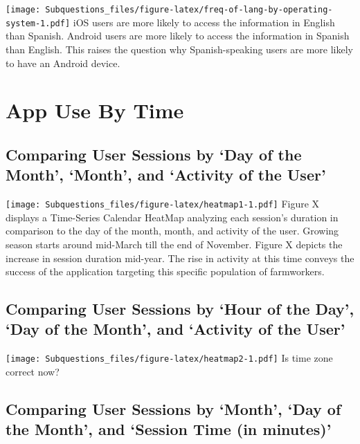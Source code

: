 \documentclass[
]{article}
\begin{document}
\texttt{[image: Subquestions\_files/figure-latex/freq-of-lang-by-operating-system-1.pdf]}
iOS users are more likely to access the information in English than
Spanish. Android users are more likely to access the information in
Spanish than English. This raises the question why Spanish-speaking
users are more likely to have an Android device.

\hypertarget{app-use-by-time}{%
\section{App Use By Time}\label{app-use-by-time}}

\hypertarget{comparing-user-sessions-by-day-of-the-month-month-and-activity-of-the-user}{%
\subsection{Comparing User Sessions by `Day of the Month', `Month', and
`Activity of the
User'}\label{comparing-user-sessions-by-day-of-the-month-month-and-activity-of-the-user}}

\texttt{[image: Subquestions\_files/figure-latex/heatmap1-1.pdf]} Figure
X displays a Time-Series Calendar HeatMap analyzing each session's
duration in comparison to the day of the month, month, and activity of
the user. Growing season starts around mid-March till the end of
November. Figure X depicts the increase in session duration mid-year.
The rise in activity at this time conveys the success of the application
targeting this specific population of farmworkers.

\hypertarget{comparing-user-sessions-by-hour-of-the-day-day-of-the-month-and-activity-of-the-user}{%
\subsection{Comparing User Sessions by `Hour of the Day', `Day of the
Month', and `Activity of the
User'}\label{comparing-user-sessions-by-hour-of-the-day-day-of-the-month-and-activity-of-the-user}}

\texttt{[image: Subquestions\_files/figure-latex/heatmap2-1.pdf]} Is time
zone correct now?

\hypertarget{comparing-user-sessions-by-month-day-of-the-month-and-session-time-in-minutes}{%
\subsection{Comparing User Sessions by `Month', `Day of the Month', and
`Session Time (in
minutes)'}\label{comparing-user-sessions-by-month-day-of-the-month-and-session-time-in-minutes}}
\end{document}
